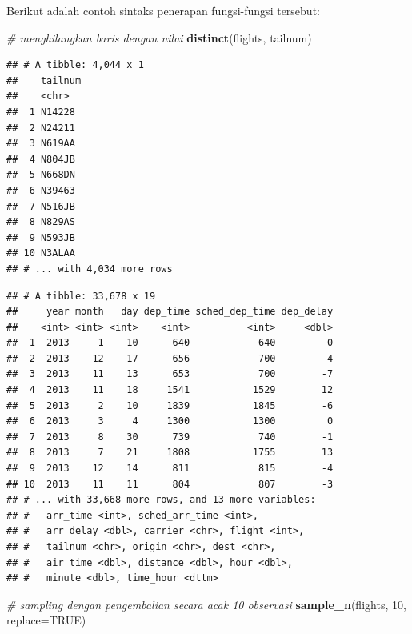 \documentclass[]{book}
\newenvironment{Shaded}{\begin{snugshade}}{\end{snugshade}}
\newcommand{\KeywordTok}[1]{\textcolor[rgb]{0.13,0.29,0.53}{\textbf{#1}}}
\newcommand{\DataTypeTok}[1]{\textcolor[rgb]{0.13,0.29,0.53}{#1}}
\newcommand{\DecValTok}[1]{\textcolor[rgb]{0.00,0.00,0.81}{#1}}
\newcommand{\FloatTok}[1]{\textcolor[rgb]{0.00,0.00,0.81}{#1}}
\newcommand{\CommentTok}[1]{\textcolor[rgb]{0.56,0.35,0.01}{\textit{#1}}}
\newcommand{\OtherTok}[1]{\textcolor[rgb]{0.56,0.35,0.01}{#1}}
\newcommand{\NormalTok}[1]{#1}
\begin{document}
Berikut adalah contoh sintaks penerapan fungsi-fungsi tersebut:

\begin{Shaded}
\begin{Highlighting}[]
\CommentTok{# menghilangkan baris dengan nilai}
\KeywordTok{distinct}\NormalTok{(flights, tailnum)}
\end{Highlighting}
\end{Shaded}

\begin{verbatim}
## # A tibble: 4,044 x 1
##    tailnum
##    <chr>  
##  1 N14228 
##  2 N24211 
##  3 N619AA 
##  4 N804JB 
##  5 N668DN 
##  6 N39463 
##  7 N516JB 
##  8 N829AS 
##  9 N593JB 
## 10 N3ALAA 
## # ... with 4,034 more rows
\end{verbatim}

\begin{Shaded}
\end{Shaded}

\begin{verbatim}
## # A tibble: 33,678 x 19
##     year month   day dep_time sched_dep_time dep_delay
##    <int> <int> <int>    <int>          <int>     <dbl>
##  1  2013     1    10      640            640         0
##  2  2013    12    17      656            700        -4
##  3  2013    11    13      653            700        -7
##  4  2013    11    18     1541           1529        12
##  5  2013     2    10     1839           1845        -6
##  6  2013     3     4     1300           1300         0
##  7  2013     8    30      739            740        -1
##  8  2013     7    21     1808           1755        13
##  9  2013    12    14      811            815        -4
## 10  2013    11    11      804            807        -3
## # ... with 33,668 more rows, and 13 more variables:
## #   arr_time <int>, sched_arr_time <int>,
## #   arr_delay <dbl>, carrier <chr>, flight <int>,
## #   tailnum <chr>, origin <chr>, dest <chr>,
## #   air_time <dbl>, distance <dbl>, hour <dbl>,
## #   minute <dbl>, time_hour <dttm>
\end{verbatim}

\begin{Shaded}
\begin{Highlighting}[]
\CommentTok{# sampling dengan pengembalian secara acak 10 observasi}
\KeywordTok{sample_n}\NormalTok{(flights, }\DecValTok{10}\NormalTok{, }\DataTypeTok{replace=}\OtherTok{TRUE}\NormalTok{)}
\end{Highlighting}
\end{Shaded}
\end{document}
